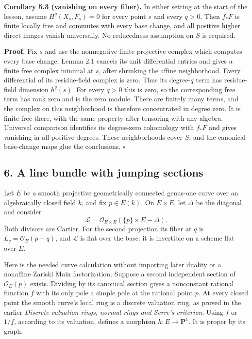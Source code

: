 \documentclass[11pt]{article}
\begin{document}
\textbf{Corollary 5.3 (vanishing on every fiber).} In either setting at
the start of the lesson, assume \(H^q(X_s,F_s)=0\) for every point \(s\)
and every \(q>0\). Then \(f_*F\) is finite locally free and commutes
with every base change, and all positive higher direct images vanish
universally. No reducedness assumption on \(S\) is required.

\textbf{Proof.} Fix \(s\) and use the nonnegative finite projective
complex which computes every base change. Lemma 2.1 cancels its unit
differential entries and gives a finite free complex minimal at \(s\),
after shrinking the affine neighborhood. Every differential of its
residue-field complex is zero. Thus its degree-\(q\) term has
residue-field dimension \(h^q(s)\). For every \(q>0\) this is zero, so
the corresponding free term has rank zero and is the zero module. There
are finitely many terms, and the complex on this neighborhood is
therefore concentrated in degree zero. It is finite free there, with the
same property after tensoring with any algebra. Universal comparison
identifies its degree-zero cohomology with \(f_*F\) and gives vanishing
in all positive degrees. These neighborhoods cover \(S\), and the
canonical base-change maps glue the conclusions. \(\square\)

\subsection{6. A line bundle with jumping
sections}\label{a-line-bundle-with-jumping-sections}

Let \(E\) be a smooth projective geometrically connected genus-one curve
over an algebraically closed field \(k\), and fix \(p\in E(k)\). On
\(E\times E\), let \(\Delta\) be the diagonal and consider \[
\mathcal L=\mathcal O_{E\times E}(\{p\}\times E-\Delta).
\] Both divisors are Cartier. For the second projection its fiber at
\(q\) is \(L_q=\mathcal O_E(p-q)\), and \(\mathcal L\) is flat over the
base: it is invertible on a scheme flat over \(E\).

Here is the needed curve calculation without importing later duality or
a nonaffine Zariski Main factorization. Suppose a second independent
section of \(\mathcal O_E(p)\) exists. Dividing by its canonical section
gives a nonconstant rational function \(f\) with its only pole a simple
pole at the rational point \(p\). At every closed point the smooth
curve's local ring is a discrete valuation ring, as proved in the
earlier \emph{Discrete valuation rings, normal rings and Serre's
criterion}. Using \(f\) or \(1/f\), according to its valuation, defines
a morphism \(h:E\to\mathbf P^1\). It is proper by its graph.
\end{document}
